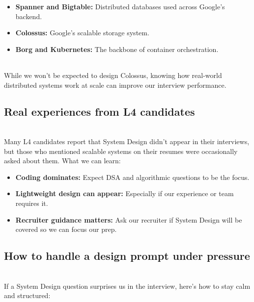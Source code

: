 \begin{itemize}
\item
\protect{}\label{Dxo-I9PlgbQd4VaswstQL}
\textbf{Spanner and Bigtable:} Distributed databases used across Google's backend.
\item
\protect{}\label{U80-nc6focGfWJnSH6SJb}
\textbf{Colossus:} Google's scalable storage system.
\item
\protect{}\label{P3WnnczWGZvGoU9yDPaoU}
\textbf{Borg and Kubernetes:} The backbone of container orchestration.
\end{itemize}
\\
While we won't be expected to design Colossus, knowing how real-world distributed systems work at scale can improve our interview performance.

\subsection{Real experiences from L4 candidates}\label{4irfZb0LTRJqwStQuRP1g}
\\
Many L4 candidates report that System Design didn't appear in their interviews, but those who mentioned scalable systems on their resumes were occasionally asked about them. What we can learn:

\begin{itemize}
\item
\protect{}\label{3-5qYUjsKZKg7DaxGx5mL}
\textbf{Coding dominates:} Expect DSA and algorithmic questions to be the focus.
\item
\protect{}\label{5H26oZSdnOOnzn13reoLJ}
\textbf{Lightweight design can appear:} Especially if our experience or team requires it.
\item
\protect{}\label{cycZGDMC7ub0EFezEjU8r}
\textbf{Recruiter guidance matters:} Ask our recruiter if System Design will be covered so we can focus our prep.
\end{itemize}

\subsection{How to handle a design prompt under pressure}\label{acKcNO6dAclZTfjCFtF6Q}
\\
If a System Design question surprises us in the interview, here's how to stay calm and structured:

